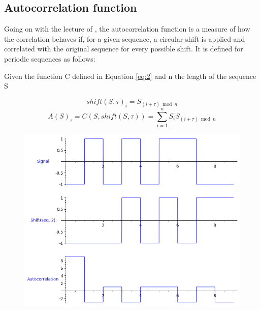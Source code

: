 \subsection{Autocorrelation function}

Going on with the lecture of \citet{golomb_ref}, the autocorrelation function
is a measure of how the correlation behaves if, for a given sequence, a
circular shift is applied and correlated with the original sequence for every
possible shift. It is defined for periodic sequences as follows:

\begin{definition}[Autocorrelation]\label{def:3}

Given the function C defined in Equation \eqref{eq:2} and n the length of the
sequence S

\begin{equation}\label{eq:3}
  shift(S, \tau)_i = S_{(i+\tau) \bmod n}
\end{equation}
\begin{equation}\label{eq:4}
  A(S)_{\tau} = C(S, shift(S, \tau)) = \sum_{i=1}^{n}S_{i}S_{(i+\tau) \bmod n}
\end{equation}

\end{definition}

\begin{figure}[ht!] %
\begin{center}
\includegraphics[width=0.7\linewidth]{Chapters/Introduction/signals_autocorrelation}
\end{center}
\caption{}
\label{introduction_signals_autocorrelation}
\end{figure}

